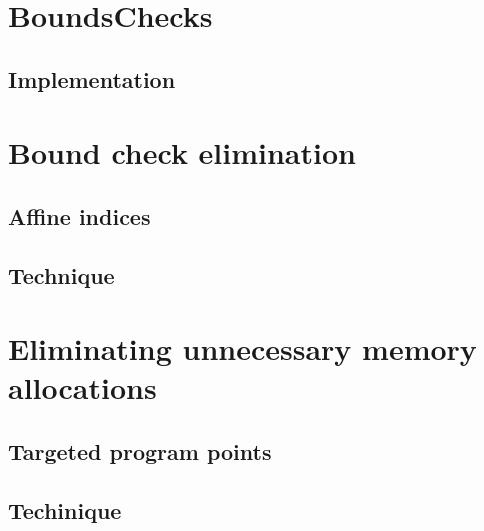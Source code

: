 \section{BoundsChecks}
\subsection{Implementation}
\section{Bound check elimination}
\subsection{Affine indices}
\subsection{Technique}
\section{Eliminating unnecessary memory allocations}
\subsection{Targeted program points}
\subsection{Techinique}





